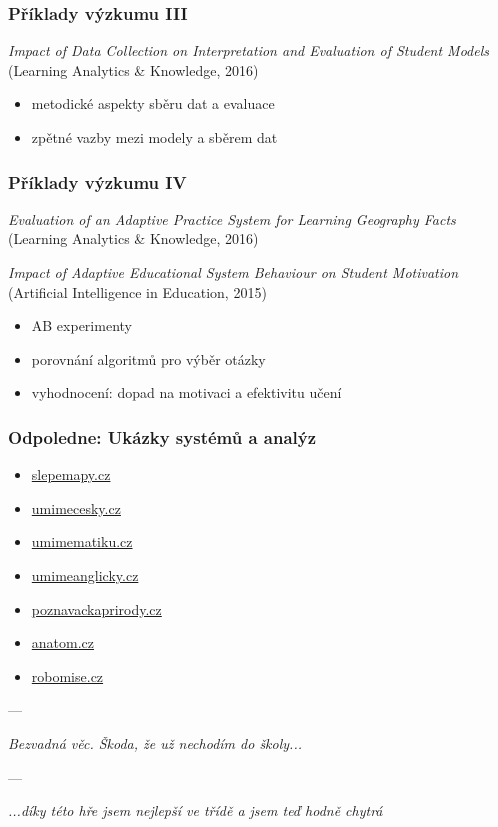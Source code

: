 \documentclass[bigger]{beamer}
\begin{document}
\begin{frame}
  \frametitle{Příklady výzkumu III}

  \emph{Impact of Data Collection on Interpretation and Evaluation of Student
    Models} (Learning Analytics \& Knowledge, 2016)

  \bigskip

  \begin{itemize}
  \item metodické aspekty sběru dat a evaluace
  \item zpětné vazby mezi modely a sběrem dat
  \end{itemize}
\end{frame}

\begin{frame}
  \frametitle{Příklady výzkumu IV}

  \emph{Evaluation of an Adaptive Practice System for Learning Geography Facts}
  (Learning Analytics \& Knowledge, 2016)

  \emph{Impact of Adaptive Educational System Behaviour on Student Motivation } (Artificial Intelligence in Education, 2015)

  \bigskip

  \begin{itemize}
  \item AB experimenty
  \item porovnání algoritmů pro výběr otázky
  \item vyhodnocení: dopad na motivaci a efektivitu učení
  \end{itemize}
\end{frame}

\begin{frame}
   \frametitle{Odpoledne: Ukázky systémů a analýz}

   \begin{itemize}
   \item \url{slepemapy.cz}
   \item \url{umimecesky.cz}
   \item \url{umimematiku.cz}
   \item \url{umimeanglicky.cz}
   \item \url{poznavackaprirody.cz}
   \item \url{anatom.cz}
   \item \url{robomise.cz}
   \end{itemize}
---
\medskip

\emph{Bezvadná věc. Škoda, že už nechodím do školy...}

\medskip
---
\medskip

\emph{...díky této hře jsem nejlepší ve třídě a jsem teď hodně chytrá}

\end{frame}
\end{document}
